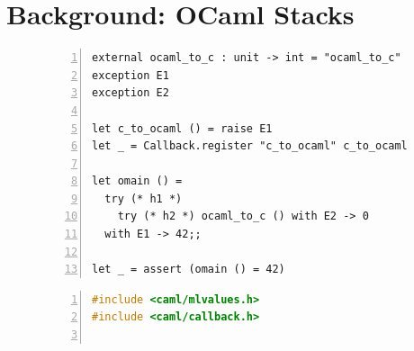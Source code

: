 \documentclass[sigplan,10pt,review,anonymous]{acmart}\settopmatter{printfolios=true,printccs=false,printacmref=false}
\begin{document}
\section{Background: OCaml Stacks}
\label{sec:stack}

\begin{figure}
\begin{minipage}{0.59\linewidth}
	\begin{minipage}{\linewidth}
		\begin{lstlisting}[numbers=left]
external ocaml_to_c : unit -> int = "ocaml_to_c"
exception E1
exception E2

let c_to_ocaml () = raise E1
let _ = Callback.register "c_to_ocaml" c_to_ocaml

let omain () =
  try (* h1 *)
    try (* h2 *) ocaml_to_c () with E2 -> 0
  with E1 -> 42;;

let _ = assert (omain () = 42)
		\end{lstlisting}
    \label{code:meander_ml}
	\end{minipage}
	\begin{minipage}{\linewidth}
		\begin{lstlisting}[language=c,numbers=left]
#include <caml/mlvalues.h>
#include <caml/callback.h>


\end{lstlisting}
\end{minipage}
\end{minipage}
\end{figure}
\end{document}
